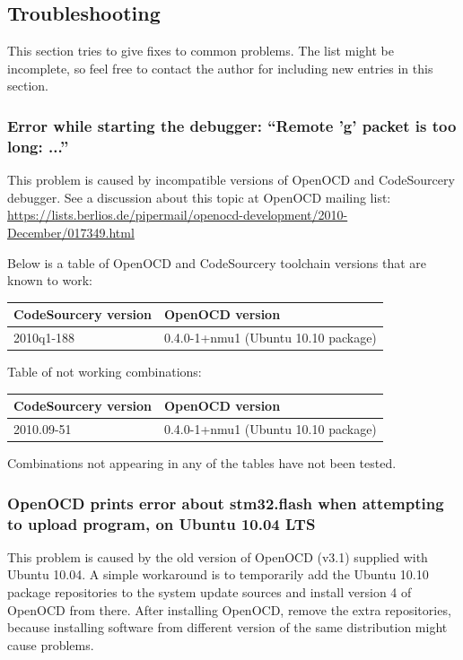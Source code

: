 \documentclass[a4paper, 10pt]{article}
\begin{document}
\subsection{Troubleshooting}

This section tries to give fixes to common problems.
The list might be incomplete, so feel free to contact the author for including
new entries in this section.

\subsubsection{Error while starting the debugger: ``Remote 'g' packet is too long: ...''}

\label{sect:gdb-problems}
This problem is caused by incompatible versions of OpenOCD and CodeSourcery debugger.
See a discussion about this topic at OpenOCD mailing list:
\url{https://lists.berlios.de/pipermail/openocd-development/2010-December/017349.html}

Below is a table of OpenOCD and CodeSourcery toolchain versions that are known to work:

    \smallskip
    \begin{tabular}{ l | l }
    CodeSourcery version & OpenOCD version \\
    \hline
    2010q1-188          &   0.4.0-1+nmu1 (Ubuntu 10.10 package) \\
    \end{tabular}
    \smallskip

Table of not working combinations:

    \smallskip
    \begin{tabular}{ l | l }
    CodeSourcery version & OpenOCD version \\
    \hline
    2010.09-51          &   0.4.0-1+nmu1 (Ubuntu 10.10 package) \\
    \end{tabular}
    \smallskip

Combinations not appearing in any of the tables have not been tested.

\subsubsection{OpenOCD prints error about stm32.flash
    when attempting to upload program,
    on Ubuntu 10.04 LTS}

This problem is caused by the old version of OpenOCD (v3.1)
supplied with Ubuntu 10.04.
A simple workaround is to temporarily add the Ubuntu 10.10 package repositories
to the system update sources and install version 4 of OpenOCD from there.
After installing OpenOCD, remove the extra repositories,
because installing software from different version of the same distribution
might cause problems.
\end{document}
